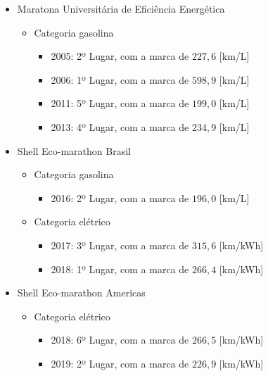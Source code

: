 \begin{itemize}
    \item Maratona Universitária de Eficiência Energética
          \begin{itemize}
              \item  Categoria gasolina
                    \begin{itemize}
                        \item 2005: 2º Lugar, com a marca de $227,6$ [km/L]
                        \item 2006: 1º Lugar, com a marca de $598,9$ [km/L]
                        \item 2011: 5º Lugar, com a marca de $199,0$ [km/L]
                        \item 2013: 4º Lugar, com a marca de $234,9$ [km/L]
                    \end{itemize}
          \end{itemize}
          \newpage
    \item Shell Eco-marathon Brasil
          \begin{itemize}
              \item  Categoria gasolina
                    \begin{itemize}
                        \item 2016: 2º Lugar, com a marca de $196,0$ [km/L]
                    \end{itemize}
              \item  Categoria elétrico
                    \begin{itemize}
                        \item 2017: 3º Lugar, com a marca de $315,6$ [km/kWh]
                        \item 2018: 1º Lugar, com a marca de $266,4$ [km/kWh]
                    \end{itemize}
          \end{itemize}
    \item Shell Eco-marathon Americas
          \begin{itemize}
              \item  Categoria elétrico
                    \begin{itemize}
                        \item 2018: 6º Lugar, com a marca de $266,5$ [km/kWh]
                        \item 2019: 2º Lugar, com a marca de $226,9$ [km/kWh]
                    \end{itemize}
          \end{itemize}
\end{itemize}

